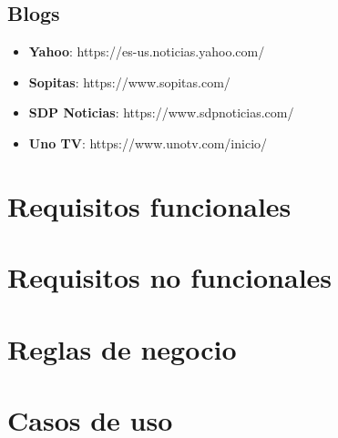 \subsection{Blogs}
\begin{itemize}
  \item \textbf{Yahoo}: https://es-us.noticias.yahoo.com/
  \item \textbf{Sopitas}: https://www.sopitas.com/
  \item \textbf{SDP Noticias}: https://www.sdpnoticias.com/
  \item \textbf{Uno TV}: https://www.unotv.com/inicio/
\end{itemize}

\section[Requisitos f.]{Requisitos funcionales}


\section[Requisitos no f.]{Requisitos no funcionales}


\section{Reglas de negocio}



\newpage
\section{Casos de uso}


\newpage


  \newpage
  
  \newpage
  
  \newpage

